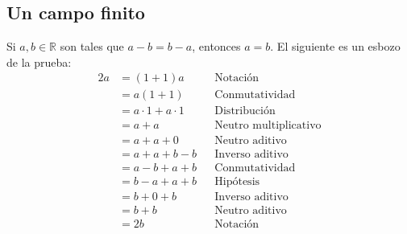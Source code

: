 \documentclass[11pt]{article}
\newcommand{\R}{\mathbb{R}}
\begin{document}
\pagebreak
\subsection*{Un campo finito}

Si $a,b\in \R$ son tales que $a-b=b-a$, entonces $a=b$. El siguiente es un esbozo de la prueba:
\vspace{1em}\begin{align*}
    2a &= (1+1)a && \text{Notación}\\
    &= a(1+1) && \text{Conmutatividad}\\
    &= a\cdot 1 + a\cdot 1 && \text{Distribución}\\
    &= a + a && \text{Neutro multiplicativo}\\
    &= a +a + 0&& \text{Neutro aditivo}\\
    &= a+a+b-b && \text{Inverso aditivo}\\
    &= a-b+a+b && \text{Conmutatividad}\\
    &= b-a +a +b && \text{Hipótesis}\\
    &= b+0 + b && \text{Inverso aditivo}\\
    &= b+b && \text{Neutro aditivo}\\
    &= 2b && \text{Notación}
\end{align*}
\end{document}
